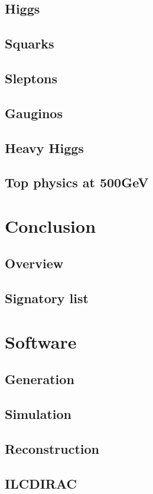 \documentclass{beamer}
\begin{document}
\subsection{Higgs}%
\subsection{Squarks}%
\subsection{Sleptons}%
\subsection{Gauginos}%
\subsection{Heavy Higgs}%
\subsection{Top physics at 500GeV}%

\section{Conclusion}
\subsection{Overview}%
\subsection{Signatory list}%

\appendix
\section{Software}
\subsection{Generation}
\subsection{Simulation}
\subsection{Reconstruction}
\subsection{ILCDIRAC}
\end{document}
